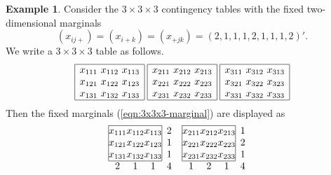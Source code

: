 \documentclass[12pt]{article}
\theoremstyle{definition}
\newtheorem{Example}[Theorem]{Example}
\begin{document}
\begin{Example}
Consider the $3\times 3\times 3$ contingency tables with the fixed
 two-dimensional marginals 
\begin{equation}
 (x_{ij+}) = (x_{i+k}) = (x_{+jk}) = (2,1,1,1,2,1,1,1,2)'.
\label{eqn:3x3x3-marginal}
\end{equation}
We write a $3\times 3\times 3$ table as follows.
\[
\begin{array}{|c|}\hline
x_{111}\ x_{112}\ x_{113}\\ x_{121}\ x_{122}\ x_{123}\\ x_{131}\
 x_{132}\ x_{133}\\ \hline
\end{array}
\hspace*{1mm}
\begin{array}{|c|}\hline
x_{211}\ x_{212}\ x_{213}\\ x_{221}\ x_{222}\ x_{223}\\ x_{231}\
 x_{232}\ x_{233}\\ \hline
\end{array}
\hspace*{1mm}
\begin{array}{|c|}\hline
x_{311}\ x_{312}\ x_{313}\\ x_{321}\ x_{322}\ x_{323}\\ x_{331}\
 x_{332}\ x_{333}\\ \hline
\end{array}
\]
Then the fixed marginals (\ref{eqn:3x3x3-marginal}) are displayed as
\[
\begin{array}{|@{}c@{}c@{}c@{}|c}\cline{1-3}
 x_{111} & x_{112}& x_{113}& 2\\
 x_{121} & x_{122}& x_{123}& 1\\
 x_{131} & x_{132}& x_{133}& 1\\ \cline{1-3}
  \multicolumn{1}{c}{2} & 1 & \multicolumn{1}{c}{1} & 4 
\end{array}
\hspace*{2mm}
\begin{array}{|@{}c@{}c@{}c@{}|c}\cline{1-3}
 x_{211} & x_{212}& x_{213}& 1\\
 x_{221} & x_{222}& x_{223}& 2\\
 x_{231} & x_{232}& x_{233}& 1\\ \cline{1-3}
  \multicolumn{1}{c}{1} & 2 & \multicolumn{1}{c}{1} & 4 
\end{array}
\hspace*{2mm}
\begin{array}{|@{}c@{}c@{}c@{}|c}\cline{1-3}

\end{array}\]
\end{Example}
\end{document}
